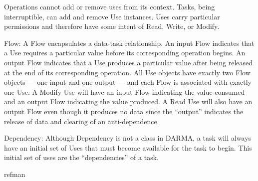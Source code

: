 \begin{compactdesc}
Operations cannot add or remove uses from its context.
Tasks, being interruptible, can add and remove Use instances.
Uses carry particular permissions and therefore have some intent of Read, Write, or Modify.
\item [Flow:] A Flow encapsulates a data-task relationship. 
An input Flow indicates that a Use requires a particular value before its
corresponding \gls{operation} begins.
An output Flow indicates that a Use produces a particular value after being
released at the end of its corresponding \gls{operation}.
All Use objects have exactly two Flow objects --- one input and one output ---
and each Flow is associated with exactly one Use.
A Modify Use will have an input Flow indicating the value consumed and an output Flow indicating the value produced.
A Read Use will also have an output Flow even though it produces no data since the ``output'' indicates the release of data and clearing of an anti-dependence.
\item [Dependency:] Although Dependency is not a class in \gls{DARMA}, a
  \gls{task} will always have an initial set of Uses that must become
  available for the \gls{task} to begin.
  This initial set of uses are the ``dependencies'' of a \gls{task}.
\end{compactdesc} 

{refman}
